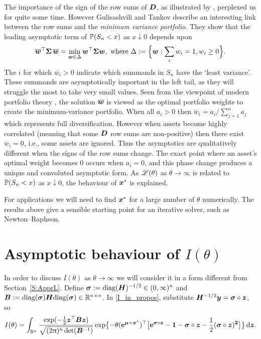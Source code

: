 \begin{remark}\label{Rem:25.8b} \rm The importance of the sign of the row sums of
  $\bm{D}$, as illustrated by , perplexed us for
  quite some time. However Gulisashvili and Tankov \cite{tankov2015tail}
  describe an interesting link between the row sums and the \emph{minimum
    variance portfolio}. They show that the leading asymptotic term of
  $\operatorname{{\mathbb P}}(S_n < x)$ as $x \downarrow 0$ depends upon
%
\[ \overline{\bm{w}}^\top \bm{\Sigma} \, \overline{\bm{w}}
 = \min_{\bm{w} \in \Delta} \bm{w}^\top \bm{\Sigma}  \bm{w} , \text{ where }
\Delta := \Bigl\{ \bm{w} : \sum_i w_i = 1, w_i \geq 0 \Bigr\} . \]
%
The $i$ for which $\overline{w}_i > 0$ indicate which summands in $S_n$ have
the `least variance'. These summands are asymptotically important in the left
tail, as they will struggle the most to take very small values. Seen from the
viewpoint of modern portfolio theory \cite{markowitz1952portfolio}, the
solution $\overline{\bm{w}}$ is viewed as the optimal portfolio weights to
create the minimum-variance portfolio. When all $a_i > 0$ then $\overline{w}_i
= a_i / \sum_{j=1}^n a_j$ which represents full diversification. However when
assets become highly correlated (meaning that some $\bm{D}$ row sums are
non-positive) then there exist $\overline{w}_i = 0$, i.e., some assets are
ignored. Thus the asymptotics are qualitatively different when the signs of
the row sums change. The exact point where an asset's optimal weight becomes 0
occurs when $a_i = 0$, and this phase change produces a unique and convoluted
asymptotic form. As $\mathscr{L}(\theta)$ as $\theta \to \infty$ is related to
$\operatorname{{\mathbb P}}(S_n < x)$ as $x \downarrow 0$, the behaviour of $\bm{x}^*$ is
explained. \remQED
\end{remark}

For applications we will need to find $\bm{x}^*$ for a large number of $\theta$
numerically. The results above give a sensible starting point for an iterative
solver, such as Newton--Raphson.

\section{Asymptotic behaviour of $I(\theta)$}\label{S:Asympt}

In order to discuss $I(\theta)$ as $\theta \to \infty$ we will consider it in
a form different from Section~\ref{S:ApprL}. Define $ \bm{\sigma} :=
\mathrm{diag}(\bm{H})^{-1/2} \in (0,\infty)^n$ and $\bm{B} :=
\mathrm{diag}(\bm{\sigma}) \bm{H} \mathrm{diag}(\bm{\sigma}) \in \mathbb{R}^{n \times
  n}$.  In \eqref{I_in_propos}, substitute $\bm{H}^{-1/2} \bm{y} = \bm{\sigma} \circ \bm{z}$, so
\begin{equation} \label{new_I}
	I(\theta) = \int_{\mathbb{R}^n}
 \frac{\exp( {-}\frac12 \bm{z}^\top \bm{B} \bm{z})}{\sqrt{(2\uppi)^n\det(\bm{B}^{-1})}}
	\exp\bigl\{{-}\theta (\text{\bf{e}}^{\bm{\mu} + \bm{x}^*})^\top \bigl[ \text{\bf{e}}^{\bm{\sigma} \circ \bm{z}} - \bm{1} - \bm{\sigma} \circ \bm{z} - \frac12(\bm{\sigma} \circ \bm{z})^{\bm{2}} \bigr] \bigr\}\mathop{}\!\mathrm{d} \bm{z} .
\end{equation}

